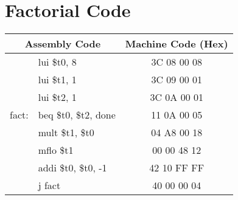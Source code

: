 \documentclass[11pt]{article}
\begin{document}
  \section{Factorial Code}
     \begin{center}
     \begin{tabular}{|rl|c|}
         \hline
         \multicolumn{2}{|c|}{Assembly Code} & Machine Code (Hex)\\
         \hline\hline
         & lui \$t0, 8 & 3C 08 00 08\\
         & lui \$t1, 1 & 3C 09 00 01\\
         & lui \$t2, 1 & 3C 0A 00 01\\
         fact: & beq \$t0, \$t2, done & 11 0A 00 05\\
         & mult \$t1, \$t0 & 04 A8 00 18\\
         & mflo \$t1 & 00 00 48 12\\
         & addi \$t0, \$t0, -1 & 42 10 FF FF\\
         & j fact & 40 00 00 04\\
         \hline
     \end{tabular}
     \end{center}
\end{document}
